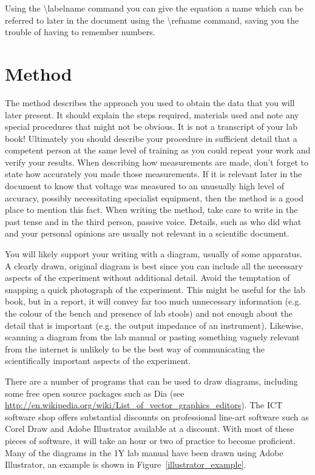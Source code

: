 \documentclass{article}
\begin{document}
Using the \textbackslash label{name} command you can give the equation a name which can be referred to later in the document using the \textbackslash ref{name} command, saving you the trouble of having to remember numbers. 

\section{Method}
The method describes the approach you used to obtain the data that you will later present.  It should explain the steps required, materials used and note any special procedures that might not be obvious. It is not a transcript of your lab book!  Ultimately you should describe your procedure in sufficient detail that a competent person at the same level of training as you could repeat your work and verify your results.  When describing how measurements are made, don’t forget to state how accurately you made those measurements.  If it is relevant later in the document to know that voltage was measured to an unusually high level of accuracy, possibly necessitating specialist equipment, then the method is a good place to mention this fact. 
When writing the method, take care to write in the past tense and in the third person, passive voice. Details, such as who did what and your personal opinions are usually not relevant in a scientific document.

You will likely support your writing with a diagram, usually of some apparatus.  A clearly drawn, original diagram is best since you can include all the necessary aspects of the experiment without additional detail.  Avoid the temptation of snapping a quick photograph of the experiment.  This might be useful for the lab book, but in a report, it will convey far too much unnecessary information (e.g. the colour of the bench and presence of lab stools) and not enough about the detail that is important (e.g. the output impedance of an instrument).   Likewise, scanning a diagram from the lab manual or pasting something vaguely relevant from the internet is unlikely to be the best way of communicating the scientifically important aspects of the experiment. 
 
There are a number of programs that can be used to draw diagrams, including some free open source packages such as Dia 
(see 
\url{http://en.wikipedia.org/wiki/List_of_vector_graphics_editors}).  
The ICT software shop offers substantial discounts on professional line-art software such as Corel Draw and Adobe Illustrator available at a discount.  With most of these pieces of software, it will take an hour or two of practice to become proficient. Many of the diagrams in the 1Y lab manual have been drawn using Adobe Illustrator, an example is shown in Figure~\ref{illustrator_example}.
\end{document}
